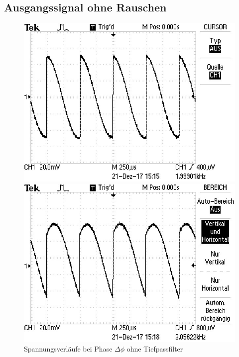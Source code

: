 \subsection{Ausgangssignal ohne Rauschen}
\label{sec:oR}
\begin{figure}
\centering
\caption{Spannungsverläufe bei Phase $\Delta\phi$ ohne Tiefpassfilter}
\begin{minipage}{0.48\textwidth}
\includegraphics[scale=0.6]{content/images/00.jpg}
\end{minipage}
\begin{minipage}{0.48\textwidth}
\includegraphics[scale=0.6]{content/images/45.jpg}
\end{minipage}

\end{figure}
